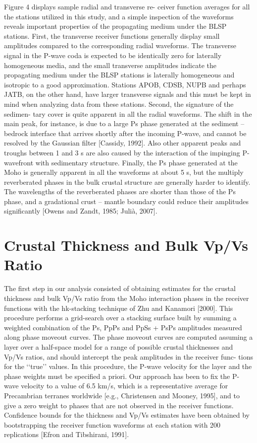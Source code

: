 \documentclass[long]{geophysics}
\begin{document}
Figure 4 displays sample radial and transverse re-
ceiver function averages for all the stations utilized in this
study, and a simple inspection of the waveforms reveals
important properties of the propagating medium under the
BLSP stations. First, the transverse receiver functions
generally display small amplitudes compared to the
corresponding radial waveforms. The transverse signal in
the P-wave coda is expected to be identically zero for
laterally homogeneous media, and the small transverse
amplitudes indicate the propagating medium under the
BLSP stations is laterally homogeneous and isotropic to a
good approximation. Stations APOB, CDSB, NUPB and
perhaps JATB, on the other hand, have larger transverse
signals and this must be kept in mind when analyzing data
from these stations. Second, the signature of the sedimen-
tary cover is quite apparent in all the radial waveforms. The
shift in the main peak, for instance, is due to a large Ps
phase generated at the sediment – bedrock interface that
arrives shortly after the incoming P-wave, and cannot be
resolved by the Gaussian filter [Cassidy, 1992]. Also other
apparent peaks and troughs between 1 and 3 s are also
caused by the interaction of the impinging P-wavefront with
sedimentary structure. Finally, the Ps phase generated at the
Moho is generally apparent in all the waveforms at about 5 s,
but the multiply reverberated phases in the bulk crustal
structure are generally harder to identify. The wavelengths
of the reverberated phases are shorter than those of the Ps
phase, and a gradational crust – mantle boundary could
reduce their amplitudes significantly [Owens and Zandt,
1985; Julià, 2007].


\section{ Crustal Thickness and Bulk Vp/Vs Ratio}
The first step in our analysis consisted of obtaining
estimates for the crustal thickness and bulk Vp/Vs ratio
from the Moho interaction phases in the receiver functions
with the hk-stacking technique of Zhu and Kanamori
[2000]. This procedure performs a grid-search over a
stacking surface built by summing a weighted combination
of the Ps, PpPs and PpSs + PsPs amplitudes measured along phase moveout curves. The phase moveout curves are
computed assuming a layer over a half-space model for a
range of possible crustal thicknesses and Vp/Vs ratios, and
should intercept the peak amplitudes in the receiver func-
tions for the ‘‘true’’ values. In this procedure, the P-wave
velocity for the layer and the phase weights must be
specified a priori. Our approach has been to fix the P-wave
velocity to a value of 6.5 km/s, which is a representative
average for Precambrian terranes worldwide [e.g., Christensen
and Mooney, 1995], and to give a zero weight to phases that
are not observed in the receiver functions. Confidence
bounds for the thickness and Vp/Vs estimates have been
obtained by bootstrapping the receiver function waveforms at
each station with 200 replications [Efron and Tibshirani,
1991].
\end{document}

